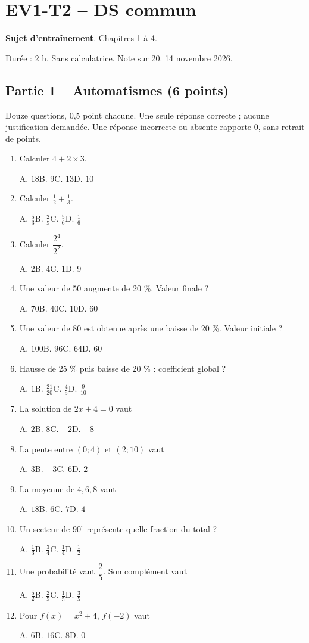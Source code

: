 \clearpage\section*{EV1-T2 -- DS commun}\label{EV1-T2}
\textbf{Sujet d’entraînement}. Chapitres 1 à 4.\par Durée : 2 h. Sans calculatrice. Note sur 20. 14 novembre 2026.
\subsection*{Partie 1 -- Automatismes (6 points)}
Douze questions, 0,5 point chacune. Une seule réponse correcte ; aucune justification demandée. Une réponse incorrecte ou absente rapporte 0, sans retrait de points.
\begin{enumerate}
\item Calculer $4+2\times3$.\par A. $18$\quad B. $9$\quad C. $13$\quad D. $10$
\item Calculer $\frac12+\frac13$.\par A. $\frac{5}{3}$\quad B. $\frac{2}{5}$\quad C. $\frac{5}{6}$\quad D. $\frac{1}{6}$
\item Calculer $\dfrac{2^4}{2^{2}}$.\par A. $2$\quad B. $4$\quad C. $1$\quad D. $9$
\item Une valeur de 50 augmente de 20 \%. Valeur finale ?\par A. $70$\quad B. $40$\quad C. $10$\quad D. $60$
\item Une valeur de 80 est obtenue après une baisse de 20 \%. Valeur initiale ?\par A. $100$\quad B. $96$\quad C. $64$\quad D. $60$
\item Hausse de 25 \% puis baisse de 20 \% : coefficient global ?\par A. $1$\quad B. $\frac{21}{20}$\quad C. $\frac{4}{5}$\quad D. $\frac{9}{10}$
\item La solution de $2x+4=0$ vaut\par A. $2$\quad B. $8$\quad C. $-2$\quad D. $-8$
\item La pente entre $(0;4)$ et $(2;10)$ vaut\par A. $3$\quad B. $-3$\quad C. $6$\quad D. $2$
\item La moyenne de $4, 6, 8$ vaut\par A. $18$\quad B. $6$\quad C. $7$\quad D. $4$
\item Un secteur de $90^\circ$ représente quelle fraction du total ?\par A. $\frac{1}{3}$\quad B. $\frac{3}{4}$\quad C. $\frac{1}{4}$\quad D. $\frac{1}{2}$
\item Une probabilité vaut $\dfrac{2}{5}$. Son complément vaut\par A. $\frac{5}{2}$\quad B. $\frac{2}{5}$\quad C. $\frac{1}{5}$\quad D. $\frac{3}{5}$
\item Pour $f(x)=x^2+4$, $f(-2)$ vaut\par A. $6$\quad B. $16$\quad C. $8$\quad D. $0$
\end{enumerate}
